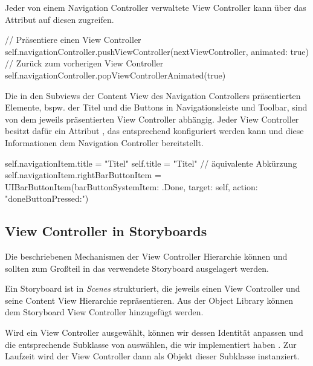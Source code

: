 \documentclass[parskip=half, final]{scrreprt}
\begin{document}
Jeder von einem Navigation Controller verwaltete View Controller kann über das Attribut  auf diesen zugreifen.

\begin{swiftcode}
// Präsentiere einen View Controller
self.navigationController.pushViewController(nextViewController, animated: true)
// Zurück zum vorherigen View Controller
self.navigationController.popViewControllerAnimated(true)
\end{swiftcode}

Die in den Subviews der Content View des Navigation Controllers präsentierten Elemente, bspw. der Titel und die Buttons in Navigationsleiste und Toolbar, sind von dem jeweils präsentierten View Controller abhängig. Jeder View Controller besitzt dafür ein Attribut , das entsprechend konfiguriert werden kann und diese Informationen dem Navigation Controller bereitstellt.

\begin{swiftcode}
self.navigationItem.title = "Titel"
self.title = "Titel" // äquivalente Abkürzung
self.navigationItem.rightBarButtonItem = UIBarButtonItem(barButtonSystemItem: .Done, target: self, action: "doneButtonPressed:")
\end{swiftcode}

\subsection{View Controller in Storyboards}

Die beschriebenen Mechanismen der View Controller Hierarchie können und sollten zum Großteil in das verwendete Storyboard ausgelagert werden.

Ein Storyboard ist in \emph{Scenes} strukturiert, die jeweils einen View Controller und seine Content View Hierarchie repräsentieren. Aus der Object Library können dem Storyboard View Controller hinzugefügt werden.

Wird ein View Controller ausgewählt, können wir dessen Identität anpassen und die entsprechende Subklasse von  auswählen, die wir implementiert haben . Zur Laufzeit wird der View Controller dann als Objekt dieser Subklasse instanziert.

\end{document}
